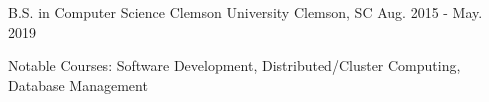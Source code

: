 

\begin{cventries}

  \cventry
    {B.S. in Computer Science} %
    {Clemson University} %
    {Clemson, SC} %
    {Aug. 2015 - May. 2019} %
    {
      \begin{cvitems} %
        \item {Notable Courses: Software Development, Distributed/Cluster Computing, Database Management}
      \end{cvitems}
    }

\end{cventries}
